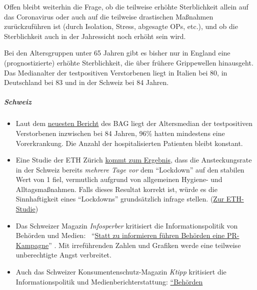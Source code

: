 Offen bleibt weiterhin die Frage, ob die teilweise erhöhte Sterblichkeit
allein auf das Coronavirus oder auch auf die teilweise drastischen
Maßnahmen zurückzuführen ist (durch Isolation, Stress, abgesagte OPs,
etc.), und ob die Sterblichkeit auch in der Jahressicht noch erhöht sein
wird.

Bei den Altersgruppen unter 65 Jahren gibt es bisher nur in England eine
(prognostizierte) erhöhte Sterblichkeit, die über frühere Grippewellen
hinausgeht. Das Medianalter der testpositiven Verstorbenen liegt in
Italien bei 80, in Deutschland bei 83 und in der Schweiz bei 84 Jahren.

\hypertarget{schweiz-1}{%
\subparagraph{\texorpdfstring{\textbf{Schweiz}}{Schweiz}}\label{schweiz-1}}

\begin{itemize}
\tightlist
\item
  Laut dem
  \href{https://www.bag.admin.ch/bag/de/home/krankheiten/ausbrueche-epidemien-pandemien/aktuelle-ausbrueche-epidemien/novel-cov/situation-schweiz-und-international.html}{neuesten
  Bericht} des BAG liegt der Altersmedian der testpositiven Verstorbenen
  inzwischen bei 84 Jahren, 96\% hatten mindestens eine Vorerkrankung.
  Die Anzahl der hospitalisierten Patienten bleibt konstant.
\item
  Eine Studie der ETH Zürich
  \href{https://www.tagesanzeiger.ch/ansteckungsraten-flachten-bereits-vor-dem-lockdown-ab-809893127675}{kommt
  zum Ergebnis}, dass die Ansteckungsrate in der Schweiz bereits
  \emph{mehrere Tage vor} dem ``Lockdown'' auf den stabilen Wert von 1
  fiel, vermutlich aufgrund von allgemeinen Hygiene- und
  Alltagsmaßnahmen. Falls dieses Resultat korrekt ist, würde es die
  Sinnhaftigkeit eines ``Lockdowns'' grundsätzlich infrage stellen.
  (\href{https://bsse.ethz.ch/cevo/research/sars-cov-2/real-time-monitoring-in-switzerland.html}{Zur
  ETH-Studie})
\item
  Das Schweizer Magazin \emph{Infosperber} kritisiert die
  Informationspolitik von Behörden und Medien:~
  ``\href{https://www.infosperber.ch/Artikel/Gesundheit/Corona-Statt-zu-informieren-fuhren-Behorden-eine-PR-Kampagne}{Statt
  zu informieren führen Behörden eine PR-Kampagne}'' . Mit irreführenden
  Zahlen und Grafiken werde eine teilweise unberechtigte Angst
  verbreitet.
\item
  Auch das Schweizer Konsumentenschutz-Magazin \emph{Ktipp} kritisiert
  die Informations­politik und Medien­bericht­erstattung:
  \href{https://www.ktipp.ch/artikel/artikeldetail/behoerden-informieren-irrefuehrend/}{``Behörden
}
\end{itemize}
